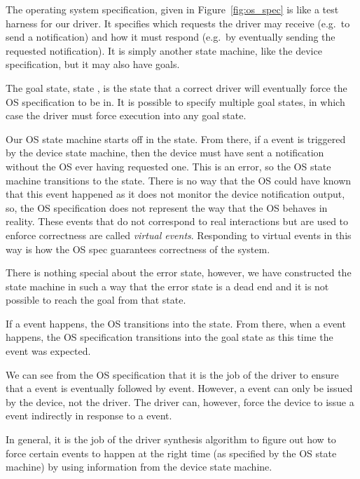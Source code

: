 The operating system specification, given in Figure~\ref{fig:os_spec} is like a test harness for our driver. It specifies which requests the driver may receive (e.g.\ to send a notification) and how it must respond (e.g.\ by eventually sending the requested notification). It is simply another state machine, like the device specification, but it may also have goals.

The goal state, state , is the state that a correct driver will eventually force the OS specification to be in. It is possible to specify multiple goal states, in which case the driver must force execution into any goal state.

Our OS state machine starts off in the  state. From there, if a  event is triggered by the device state machine, then the device must have sent a notification without the OS ever having requested one. This is an error, so the OS state machine transitions to the  state. There is no way that the OS could have known that this event happened as it does not monitor the device notification output, so, the OS specification does not represent the way that the OS behaves in reality. These events that do not correspond to real interactions but are used to enforce correctness are called \emph{virtual events}. Responding to virtual events in this way is how the OS spec guarantees correctness of the system. 

There is nothing special about the error state, however, we have constructed the state machine in such a way that the error state is a dead end and it is not possible to reach the goal from that state.

If a  event happens, the OS transitions into the  state. From there, when a  event happens, the OS specification transitions into the goal state as this time the  event was expected. 

We can see from the OS specification that it is the job of the driver to ensure that a  event is eventually followed by  event. However, a  event can only be issued by the device, not the driver. The driver can, however, force the device to issue a  event indirectly in response to a  event. 

In general, it is the job of the driver synthesis algorithm to figure out how to force certain events to happen at the right time (as specified by the OS state machine) by using information from the device state machine. 

